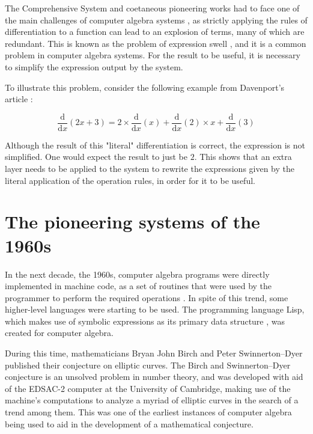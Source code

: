 The Comprehensive System and coetaneous pioneering works had to face one of the main challenges of computer algebra systems \parencite{davenport1994computer}, as strictly applying the rules of differentiation to a function can lead to an explosion of terms, many of which are redundant. This is known as the problem of expression swell \parencite{laue2019equivalence}, and it is a common problem in computer algebra systems. For the result to be useful, it is necessary to simplify the expression output by the system.

To illustrate this problem, consider the following example from Davenport's article \parencite*{davenport1994computer}:

\begin{equation}
    \frac{\mathrm{d}}{\mathrm{d}x} \left( 2x + 3 \right) = 2 \times \frac{\mathrm{d}}{\mathrm{d}x} \left( x \right) + \frac{\mathrm{d}}{\mathrm{d}x} \left( 2 \right) \times x + \frac{\mathrm{d}}{\mathrm{d}x} \left( 3 \right)
\end{equation}

Although the result of this "literal" differentiation is correct, the expression is not simplified. One would expect the result to just be $2$. This shows that an extra layer needs to be applied to the system to rewrite the expressions given by the literal application of the operation rules, in order for it to be useful.

\section{The pioneering systems of the 1960s}\label{sec:the-pioneering-systems-of-the-1960s}

In the next decade, the 1960s, computer algebra programs were directly implemented in machine code, as a set of routines that were used by the programmer to perform the required operations \parencite{davenport1994computer}. In spite of this trend, some higher-level languages were starting to be used. The programming language Lisp, which makes use of symbolic expressions as its primary data structure \parencite{mccarthy1960recursive}, was created for computer algebra.

During this time, mathematicians Bryan John Birch and Peter Swinnerton--Dyer published their conjecture on elliptic curves. The Birch and Swinnerton--Dyer conjecture \parencite*{birch1965notes} is an unsolved problem in number theory, and was developed with aid of the EDSAC-2 computer at the University of Cambridge, making use of the machine's computations to analyze a myriad of elliptic curves in the search of a trend among them. This was one of the earliest instances of computer algebra being used to aid in the development of a mathematical conjecture.

